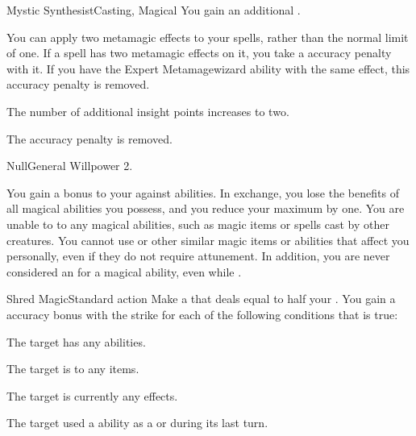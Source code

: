 \begin{magicalfeat}{Mystic Synthesist}{Casting, Magical}
     You gain an additional .

     You can apply two metamagic effects to your spells, rather than the normal limit of one.
    If a spell has two metamagic effects on it, you take a  accuracy penalty with it.
    If you have the Expert Metamage\plus wizard ability with the same effect, this accuracy penalty is removed.

     The number of additional insight points increases to two.
  
     The accuracy penalty is removed.
  \end{magicalfeat}

  \begin{feat}{Null}{General}
    \featpre Willpower 2.

     You gain a  bonus to your  against \magical abilities.
    In exchange, you lose the benefits of all magical abilities you possess, and you reduce your maximum  by one.
    You are unable to  to any magical abilities, such as magic items or spells cast by other creatures.
    You cannot use  or other similar magic items or abilities that affect you personally, even if they do not require attunement.
    In addition, you are never considered an  for a magical ability, even while \unconscious.

    \begin{activeability}{Shred Magic}{Standard action}
      \rankline
      Make a  that deals  equal to half your .
      You gain a  accuracy bonus with the strike for each of the following conditions that is true:
      \begin{raggeditemize}
        \item The target has any \magical abilities.
        \item The target is  to any \magical items.
        \item The target is currently  any \magical effects.
        \item The target used a \magical ability as a  or  during its last turn.
      \end{raggeditemize}


\end{activeability}
\end{feat}
